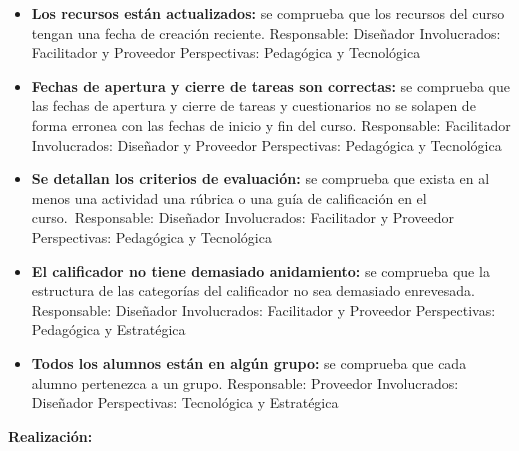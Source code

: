 \begin{itemize}
	\item
	\textbf{Los recursos están actualizados:} se comprueba que los
	recursos del curso tengan una fecha de creación reciente.
	{Responsable:} Diseñador {Involucrados:} Facilitador y
	Proveedor {Perspectivas:} Pedagógica y Tecnológica
	\item
	\textbf{Fechas de apertura y cierre de tareas son correctas:} se
	comprueba que las fechas de apertura y cierre de tareas y
	cuestionarios no se solapen de forma erronea con las fechas de inicio
	y fin del curso. {Responsable:} Facilitador
	{Involucrados:} Diseñador y Proveedor {Perspectivas:}
	Pedagógica y Tecnológica
	\item
	\textbf{Se detallan los criterios de evaluación:} se comprueba que
	exista en al menos una actividad una rúbrica o una guía de calificación
	en el curso.~{Responsable:} Diseñador {Involucrados:}
	Facilitador y Proveedor {Perspectivas:} Pedagógica y Tecnológica
	\item
	\textbf{El calificador no tiene demasiado anidamiento:} se comprueba
	que la estructura de las categorías del calificador no sea demasiado
	enrevesada. {Responsable:} Diseñador {Involucrados:}
	Facilitador y Proveedor {Perspectivas:} Pedagógica y Estratégica
	\item
	\textbf{Todos los alumnos están en algún grupo:} se comprueba que cada
	alumno pertenezca a un grupo. {Responsable:} Proveedor
	{Involucrados:} Diseñador {Perspectivas:} Tecnológica y
	Estratégica
\end{itemize}

\textbf{Realización:}

